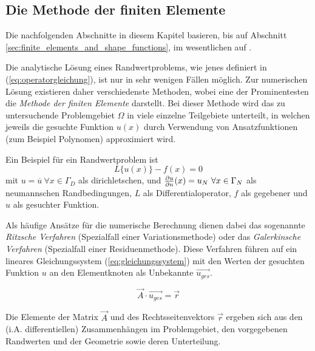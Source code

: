 \subsection{Die Methode der finiten Elemente}
\label{sec:fem_theory}
Die nachfolgenden Abschnitte in diesem Kapitel basieren, bis auf Abschnitt \ref{sec:finite_elements_and_shape_functions}, im wesentlichen auf \cite{SMS_VO_skript}.\newline

Die analytische Lösung eines Randwertproblems, wie jenes definiert in (\ref{eq:operatorgleichung}), ist nur in sehr wenigen Fällen möglich. Zur numerischen Lösung existieren daher verschiedenste Methoden, wobei eine der Prominentesten die \textit{Methode der finiten Elemente} darstellt. Bei dieser Methode wird das zu untersuchende Problemgebiet $\Omega$ in viele einzelne Teilgebiete unterteilt, in welchen jeweils die gesuchte Funktion $u(x)$ durch Verwendung von Ansatzfunktionen (zum Beispiel Polynomen) approximiert wird. \newline

Ein Beispiel für ein Randwertproblem ist
\begin{equation}
L\{u(x)\} - f(x) = 0
\label{eq:operatorgleichung}
\end{equation}
mit $u = \overline{u} \ \forall x\in \Gamma_D$ als dirichletschen, und $\frac{\partial u}{\partial n}(x) = u_N \ \forall x \in \Gamma_N $ als neumannschen Randbedingungen, $L$ als Differentialoperator, $f$ als gegebener und $u$ als gesuchter Funktion.\newline

Als häufige Ansätze für die numerische Berechnung dienen dabei das sogenannte \textit{Ritzsche Verfahren} (Spezialfall einer Variationsmethode) oder das \textit{Galerkinsche Verfahren} (Spezialfall einer Residuenmethode). Diese Verfahren führen auf ein lineares Gleichungssystem (\ref{eq:gleichungssystem}) mit den Werten der gesuchten Funktion $u$ an den Elementknoten als Unbekannte $\vec{u_{ges}}$.

\begin{equation}
\vec{A} \cdot \vec{u_{ges}} = \vec{r}
\label{eq:gleichungssystem}
\end{equation}

Die Elemente der Matrix $\vec{A}$ und des Rechtsseitenvektors $\vec{r}$ ergeben sich aus den  (i.A. differentiellen) Zusammenhängen im Problemgebiet, den vorgegebenen Randwerten und der Geometrie sowie deren Unterteilung.\newline

